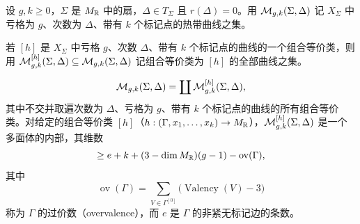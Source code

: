 \begin{definition}
设 $g,k \ge 0$，$\Sigma$ 是 $M_{\mathbb{R}}$ 中的扇，$\Delta \in T_\Sigma$ 且 $r(\Delta) = 0$。用
$\mathcal{M}_{g,k}(\Sigma,\Delta)$ 记 $X_\Sigma$ 中亏格为 $g$、次数为 $\Delta$、带有 $k$ 个标记点的热带曲线之集。

若 $[h]$ 是 $X_\Sigma$ 中亏格 $g$、次数 $\Delta$、带有 $k$ 个标记点的曲线的一个组合等价类，则用
$\mathcal{M}^{[h]}_{g,k}(\Sigma,\Delta) \subseteq \mathcal{M}_{g,k}(\Sigma,\Delta)$ 记组合等价类为 $[h]$ 的全部曲线之集。
\end{definition}

\begin{proposition}
\[
\mathcal{M}_{g,k}(\Sigma,\Delta) = \coprod \mathcal{M}^{[h]}_{g,k}(\Sigma,\Delta),
\]
其中不交并取遍次数为 $\Delta$、亏格为 $g$、带有 $k$ 个标记点的曲线的所有组合等价类。对给定的组合等价类
$[h]$（$h : (\Gamma, x_1,\dots,x_k) \to M_{\mathbb{R}}$），$\mathcal{M}^{[h]}_{g,k}(\Sigma,\Delta)$ 是一个多面体的内部，其维数
\[
\ge e + k + (3 - \dim M_{\mathbb{R}})(g - 1) - \operatorname{ov}(\Gamma),
\]
其中
\[
\operatorname{ov}(\Gamma) = \sum_{V \in \Gamma^{[0]}} \bigl(\operatorname{Valency}(V) - 3\bigr)
\]
称为 $\Gamma$ 的过价数（overvalence），而 $e$ 是 $\Gamma$ 的非紧无标记边的条数。
\end{proposition}

